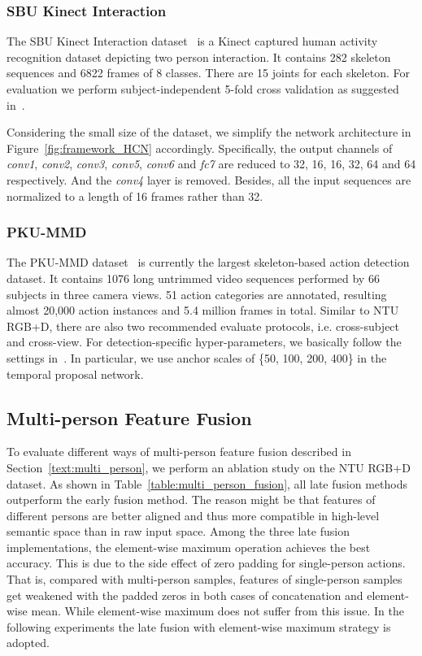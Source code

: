 \documentclass{article}
\begin{document}
\subsubsection{SBU Kinect Interaction}
The SBU Kinect Interaction dataset~\cite{SBU} is a Kinect captured human activity recognition dataset depicting two person interaction. It contains 282 skeleton sequences and 6822 frames of 8 classes. There are 15 joints for each skeleton. For evaluation we perform subject-independent 5-fold cross validation as suggested in~\cite{SBU}.

Considering the small size of the dataset, we simplify the network architecture in Figure~\ref{fig:framework_HCN} accordingly. Specifically, the output channels of \emph{conv1}, \emph{conv2}, \emph{conv3}, \emph{conv5}, \emph{conv6} and \emph{fc7} are reduced to 32, 16, 16, 32, 64 and 64 respectively. And the \emph{conv4} layer is removed. Besides, all the input sequences are normalized to a length of 16 frames rather than 32.

\subsubsection{PKU-MMD}
The PKU-MMD dataset~\cite{PKUMMD} is currently the largest skeleton-based action detection dataset. It contains 1076 long untrimmed video sequences performed by 66 subjects in three camera views. 51 action categories are annotated, resulting almost 20,000 action instances and 5.4 million frames in total. Similar to NTU RGB+D, there are also two recommended evaluate protocols, i.e. cross-subject and cross-view. For detection-specific hyper-parameters, we basically follow the settings in~\cite{Ren2015Faster}. In particular, we use anchor scales of \{50, 100, 200, 400\} in the temporal proposal network.

\subsection{Multi-person Feature Fusion}
To evaluate different ways of multi-person feature fusion described in Section~\ref{text:multi_person}, we perform an ablation study on the NTU RGB+D dataset. As shown in Table~\ref{table:multi_person_fusion}, all late fusion methods outperform the early fusion method. The reason might be that features of different persons are better aligned and thus more compatible in high-level semantic space than in raw input space. Among the three late fusion implementations, the element-wise maximum operation achieves the best accuracy. This is due to the side effect of zero padding for single-person actions. That is, compared with multi-person samples, features of single-person samples get weakened with the padded zeros in both cases of concatenation and element-wise mean. While element-wise maximum does not suffer from this issue. In the following experiments the late fusion with element-wise maximum strategy is adopted.
\end{document}
